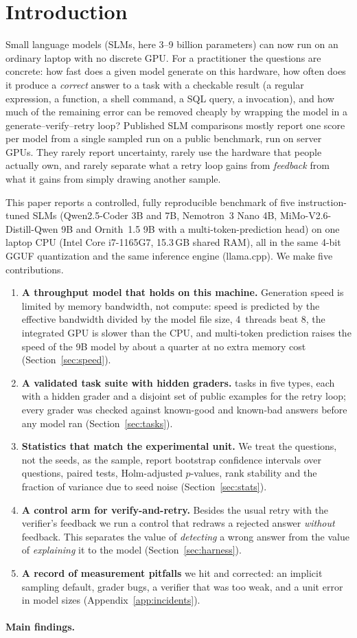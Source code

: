 \section{Introduction}
Small language models (SLMs, here 3--9 billion parameters) can now run on an ordinary laptop with no discrete GPU. For a practitioner the questions are
concrete: how fast does a given model generate on this hardware, how often does it produce a \emph{correct} answer to a task with a checkable result
(a regular expression, a function, a shell command, a SQL query, a  invocation), and how much of the remaining error can be removed
cheaply by wrapping the model in a generate--verify--retry loop? Published SLM comparisons mostly report one score per model from a single sampled run on a
public benchmark, run on server GPUs. They rarely report uncertainty, rarely use the hardware that people actually own, and rarely separate what a retry loop
gains from \emph{feedback} from what it gains from simply drawing another sample.

This paper reports a controlled, fully reproducible benchmark of five instruction-tuned SLMs (Qwen2.5-Coder 3B and 7B, Nemotron~3 Nano 4B, MiMo-V2.6-Distill-Qwen 9B and
Ornith~1.5 9B with a multi-token-prediction head) on one laptop CPU (Intel Core i7-1165G7, 15.3\,GB shared RAM), all in the same 4-bit GGUF quantization and the same
inference engine (llama.cpp). We make five contributions.
\begin{enumerate}
\item \textbf{A throughput model that holds on this machine.} Generation speed is limited by memory bandwidth, not compute: speed is predicted by the effective bandwidth
divided by the model file size, 4~threads beat 8, the integrated GPU is slower than the CPU, and multi-token prediction raises the speed of the 9B model by about a quarter at no extra memory cost (Section~\ref{sec:speed}).
\item \textbf{A validated task suite with hidden graders.} \nq{} tasks in five types, each with a hidden grader and a disjoint set of public examples for the retry loop; every grader was checked against
known-good and known-bad answers before any model ran (Section~\ref{sec:tasks}).
\item \textbf{Statistics that match the experimental unit.} We treat the questions, not the seeds, as the sample, report bootstrap confidence intervals over questions,
paired tests, Holm-adjusted $p$-values, rank stability and the fraction of variance due to seed noise (Section~\ref{sec:stats}).
\item \textbf{A control arm for verify-and-retry.} Besides the usual retry with the verifier's feedback we run a control that redraws a rejected answer \emph{without} feedback. This separates the value of
\emph{detecting} a wrong answer from the value of \emph{explaining} it to the model (Section~\ref{sec:harness}).
\item \textbf{A record of measurement pitfalls} we hit and corrected: an implicit  sampling default, grader bugs, a verifier that was too weak, and a unit error in model sizes (Appendix~\ref{app:incidents}).
\end{enumerate}
\paragraph{Main findings.} \resultsummary
